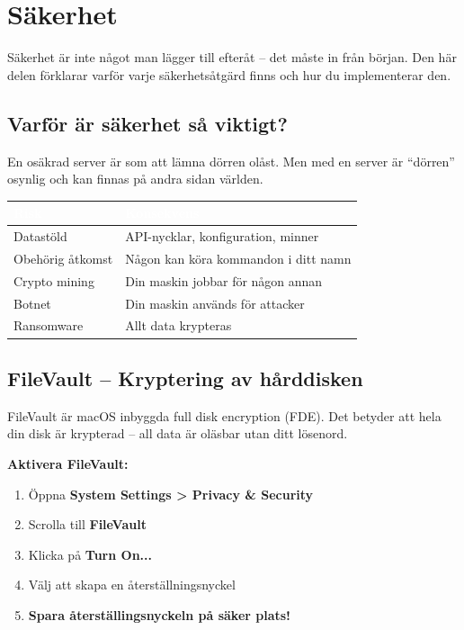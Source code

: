 \documentclass[12pt,a4paper,swedish]{article}
\begin{document}
\section{Säkerhet}
\label{sec:del2}

Säkerhet är inte något man lägger till efteråt – det måste in från början. Den här delen förklarar varför varje säkerhetsåtgärd finns och hur du implementerar den.

\subsection{Varför är säkerhet så viktigt?}
\label{sec:varfor-sakerhet}

En osäkrad server är som att lämna dörren olåst. Men med en server är \enquote{dörren} osynlig och kan finnas på andra sidan världen.

\bigskip

\begin{center}
\begin{tabular}{|l|p{8cm}|}
\hline
\rowcolor{warning}
\textcolor{white}{\textbf{Risk}} & \textcolor{white}{\textbf{Konsekvens}} \\
\hline
Datastöld & API-nycklar, konfiguration, minner \\
\hline
Obehörig åtkomst & Någon kan köra kommandon i ditt namn \\
\hline
Crypto mining & Din maskin jobbar för någon annan \\
\hline
Botnet & Din maskin används för attacker \\
\hline
Ransomware & Allt data krypteras \\
\hline
\end{tabular}
\end{center}

\subsection{FileVault – Kryptering av hårddisken}
\label{sec:filevault}

FileVault är macOS inbyggda full disk encryption (FDE). Det betyder att hela din disk är krypterad – all data är oläsbar utan ditt lösenord.

\bigskip

\textbf{Aktivera FileVault:}

\begin{enumerate}
    \item Öppna \textbf{System Settings > Privacy \& Security}
    \item Scrolla till \textbf{FileVault}
    \item Klicka på \textbf{Turn On...}
    \item Välj att skapa en återställningsnyckel
    \item \textbf{Spara återställingsnyckeln på säker plats!}
\end{enumerate}
\end{document}
